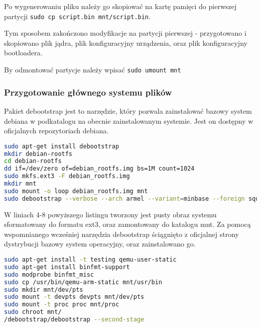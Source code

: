 Po wygenerowaniu pliku należy go skopiować na kartę pamięci do pierwszej partycji \lstinline{sudo cp script.bin mnt/script.bin}. 

Tym sposobem zakończono modyfikacje na partycji pierwszej - przygotowano i skopiowano plik jądra, plik konfiguracyjny urządzenia, oraz plik konfiguracyjny bootloadera. 

By odmontować partycje należy wpisać \lstinline{sudo umount mnt}

\subsubsection{Przygotowanie głównego systemu plików}

Pakiet debootstrap jest to narzędzie, który pozwala zainstalować bazowy system debiana w podkatalogu na obecnie zainstalowanym systemie. Jest on dostępny w oficjalnych repozytoriach debiana.

\begin{lstlisting}[language=bash]
sudo apt-get install debootstrap
mkdir debian-rootfs
cd debian-rootfs
dd if=/dev/zero of=debian_rootfs.img bs=1M count=1024
sudo mkfs.ext3 -F debian_rootfs.img
mkdir mnt
sudo mount -o loop debian_rootfs.img mnt
sudo debootstrap --verbose --arch armel --variant=minbase --foreign squeeze mnt http://ftp.debian.org/debian
\end{lstlisting}

W liniach 4-8 powyższego listingu tworzony jest pusty obraz systemu sformatowany do formatu ext3, oraz zamontowany do katalogu mnt. Za pomocą wspomnianego wcześniej narzędzia debootstrap ściągnięto z oficjalnej strony dystrybucji bazowy system operacyjny, oraz zainstalowano go.


\begin{lstlisting}[language=bash]
sudo apt-get install -t testing qemu-user-static
sudo apt-get install binfmt-support
sudo modprobe binfmt_misc
sudo cp /usr/bin/qemu-arm-static mnt/usr/bin
sudo mkdir mnt/dev/pts
sudo mount -t devpts devpts mnt/dev/pts
sudo mount -t proc proc mnt/proc
sudo chroot mnt/
/debootstrap/debootstrap --second-stage
\end{lstlisting}

